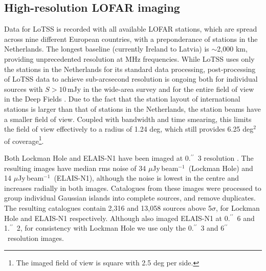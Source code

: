 \documentclass[usenatbib,fleqn,letters]{mnras}
\newcommand{\sarc}{$^{\prime\prime}\!\!$}
\newcommand{\muJybm}{$\mu$Jy$\,$beam$^{-1}$}
\begin{document}
\subsection{High-resolution LOFAR imaging}
\label{subsec:highres}

Data for LoTSS is recorded with all available LOFAR stations, which are spread across nine different European countries, with a preponderance of stations in the Netherlands. The longest baseline (currently Ireland to Latvia) is $\sim$2,000 km, providing unprecedented resolution at MHz frequencies. While LoTSS uses only the stations in the Netherlands for its standard data processing, post-processing of LoTSS data to achieve sub-arcsecond resolution is ongoing both for individual sources with $S>10\,$mJy in the wide-area survey \citep{morabito_sub-arcsecond_2022} and for the entire field of view in the Deep Fields \citep[][Escott et al., in prep; Bondi et al., in prep]{sweijen_deep_2022,de_jong_into_2024}. %
Due to the fact that the station layout of international stations is larger than that of stations in the Netherlands, the station beams have a smaller field of view. Coupled with bandwidth and time smearing, this limits the field of view effectively to a radius of 1.24 deg, which still provides 6.25 deg$^2$ of coverage\footnote{The imaged field of view is square with 2.5 deg per side.}. 

Both Lockman Hole and ELAIS-N1 have been imaged at 0.\sarc\ 3 resolution \citep[][respectively]{sweijen_deep_2022,de_jong_into_2024}. The resulting images have median rms noise of 34 \muJybm\ (Lockman Hole) and 14 \muJybm\ (ELAIS-N1), although the noise is lowest in the centre and increases radially in both images. Catalogues from these images were processed to group individual Gaussian islands into complete sources, and remove duplicates. The resulting catalogues contain 2,316 and 13,058 sources above 5$\sigma$, for Lockman Hole and ELAIS-N1 respectively. Although \cite{de_jong_into_2024} also imaged ELAIS-N1 at 0.\sarc\ 6 and 1.\sarc\ 2, for consistency with Lockman Hole we use only the 0.\sarc\ 3 and 6\sarc\ resolution images. 
\end{document}
